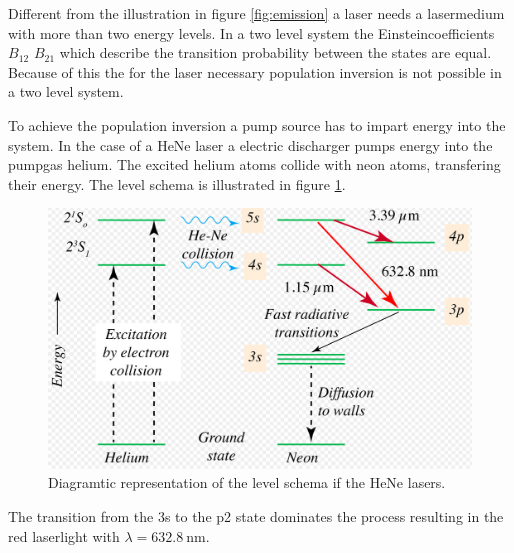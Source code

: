 Different from the illustration in figure \ref{fig:emission} a laser needs a lasermedium
with more than two energy levels. In a two level system the Einsteincoefficients 
$B_{12}$ $B_{21}$ which describe the transition probability between the states are 
equal. Because of this the for the laser necessary population inversion is not possible
in a two level system. 

To achieve the population inversion a pump source has to impart energy into the system. 
In the case of a HeNe laser a electric discharger pumps energy into the pumpgas helium. 
The excited helium atoms collide with neon atoms, transfering their energy. The 
level schema is illustrated in figure \ref{fig:level}. 

\begin{figure}
    \centering
    \includegraphics[width=\linewidth]{pictures/level.png}
    \caption{Diagramtic representation of the level schema if the HeNe lasers.}
    \label{fig:level}
\end{figure}
The transition from the 3s to the p2 state dominates the process resulting in the 
red laserlight with $\lambda = \SI{632.8}{\nano\meter}$.